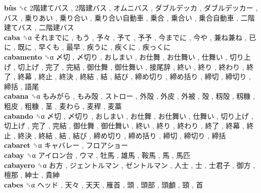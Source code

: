 \textbf{bùs} ␝ϲ   2階建てバス ,  2階建バス ,  オムニバス ,  ダブルデッカ ,  ダブルデッカー ,  バス ,  乗りあい ,  乗り合い ,  乗り合い自動車 ,  乗合 ,  乗合い ,  乗合自動車 ,  二階建てバス ,  二階建バス   \\
\textbf{caba} ␝α   それまでに ,  もう ,  予々 ,  予て ,  予予 ,  今までに ,  今や ,  兼ね兼ね ,  已に ,  既に ,  早くも ,  最早 ,  疾うに ,  疾くに ,  疾っくに   \\
\textbf{cabamento} ␝α   〆切 ,  〆切り ,  おしまい ,  お仕舞 ,  お仕舞い ,  仕舞い ,  切り上げ ,  切上げ ,  完了 ,  完結 ,  御仕舞 ,  御仕舞い ,  接尾辞 ,  終い ,  終り ,  終わり ,  終了 ,  終幕 ,  終止 ,  終決 ,  終結 ,  結 ,  結び ,  締め切り ,  締め括り ,  締切 ,  締切り ,  締括 ,  語尾   \\
\textbf{cabana} ␝α   もみがら ,  もみ殻 ,  ストロー ,  外殻 ,  外皮 ,  外被 ,  殻 ,  籾殻 ,  籾糠 ,  粗皮 ,  粗糠 ,  茎 ,  麦わら ,  麦稈 ,  麦藁   \\
\textbf{cabando} ␝α   〆切 ,  〆切り ,  おしまい ,  お仕舞 ,  お仕舞い ,  仕舞い ,  切り上げ ,  切上げ ,  完了 ,  完結 ,  御仕舞 ,  御仕舞い ,  終い ,  終り ,  終わり ,  終了 ,  終幕 ,  終止 ,  終決 ,  終結 ,  結 ,  結び ,  締め切り ,  締め括り ,  締切 ,  締切り ,  締括   \\
\textbf{cabaret} ␝α   キャバレー ,  フロアショー   \\
\textbf{cabay} ␝α   アイロン台 ,  ウマ ,  牡馬 ,  雄馬 ,  鞍馬 ,  馬 ,  馬匹   \\
\textbf{cabayero} ␝α   お方 ,  ジェントルマン ,  ゼントルマン ,  人士 ,  士 ,  士君子 ,  御方 ,  檀那 ,  紳士 ,  貴紳   \\
\textbf{cabes} ␝α   ヘッド ,  天々 ,  天天 ,  雁首 ,  頭 ,  頭部 ,  頭顱 ,  頸 ,  首   \\
